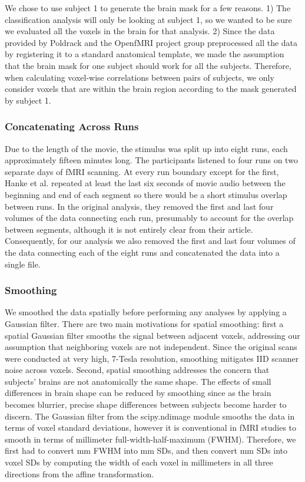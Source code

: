 \documentclass[11pt]{article}
\begin{document}
We chose to use subject 1 to generate the brain mask for a few 
reasons.  1) The classification analysis will only be looking at subject 1, so we wanted to be sure we evaluated all the voxels in the brain for that analysis.  2) Since the data provided by Poldrack and the OpenfMRI project 
group preprocessed all the data by registering it to a standard anatomical 
template, we made the assumption that the brain mask for one subject 
should work for all the subjects. Therefore, when calculating voxel-wise correlations between pairs of subjects, we only consider voxels that are within the brain region according to the mask generated by subject 1.

\subsubsection{Concatenating Across Runs}
Due to the length of the movie, the stimulus was split up into eight runs,  
each approximately fifteen minutes long. The participants listened to four  
runs on two separate days of fMRI scanning.  At every        
run boundary except for the first, Hanke et al. repeated at least the last 
six seconds of movie audio between the beginning and end of each segment so there would be a 
short stimulus overlap between runs. In the original analysis, they removed the first and last four 
volumes of the data connecting each run, presumably to account for the overlap 
between segments, although it is not entirely clear from their article. Consequently, for our analysis we also removed the first and last four 
volumes of the data connecting each of the eight runs and concatenated the data into a single file. 

\subsubsection{Smoothing}
We smoothed the data spatially before performing any analyses by applying a Gaussian      
filter. There are two main motivations for spatial smoothing: first a spatial Gaussian
filter smooths the signal between adjacent voxels, addressing                   
our assumption that neighboring voxels are not independent. Since the original scans were conducted at very high, 7-Tesla resolution, smoothing mitigates IID scanner noise across voxels. Second, spatial smoothing addresses the concern that subjects’ brains are not anatomically the same shape. The effects of small differences in brain shape can be reduced by smoothing since as the brain becomes blurrier, precise shape differences between subjects become harder to discern. The Gaussian filter from the scipy.ndimage module smooths the data in terms of voxel standard deviations, however it is conventional in fMRI studies to smooth in terms of millimeter full-width-half-maximum (FWHM).  Therefore, we first had to convert mm FWHM into mm SDs, and then convert mm SDs into voxel SDs by computing the width of each voxel in millimeters in all three directions from the affine transformation.
\end{document}
